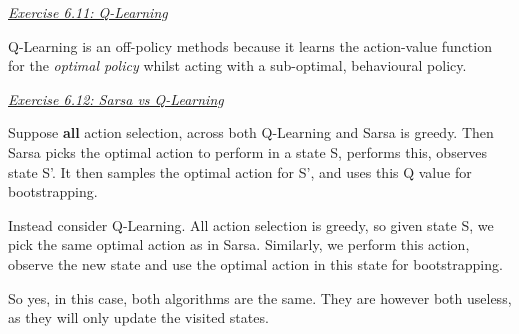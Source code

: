 \documentclass{article}
\newcommand{\myq}[1]{%
	\vspace{1em}
	\noindent\underline{\emph{Exercise #1}}\vspace{0.25em}\linebreak
}
\begin{document}
\myq{6.11: Q-Learning}
Q-Learning is an off-policy methods because it learns the action-value function for the \emph{optimal policy} whilst acting with a sub-optimal, behavioural policy. 

\myq{6.12: Sarsa vs Q-Learning}
Suppose \textbf{all} action selection, across both Q-Learning and Sarsa is greedy. Then Sarsa picks the optimal action to perform in a state S, performs this, observes state S'. It then samples the optimal action for S', and uses this Q value for bootstrapping. 

Instead consider Q-Learning. All action selection is greedy, so given state S, we pick the same optimal action as in Sarsa. Similarly, we perform this action, observe the new state and use the optimal action in this state for bootstrapping. 

So yes, in this case, both algorithms are the same. They are however both useless, as they will only update the visited states. 
\end{document}
